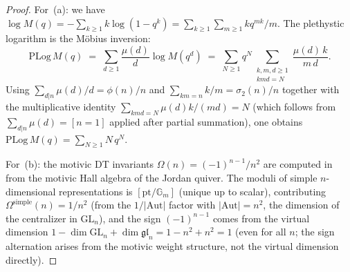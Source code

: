 \begin{proof}
For~(a): we have
$\log M(q) = -\sum_{k \ge 1} k \log(1 - q^k) = \sum_{k \ge 1}
\sum_{m \ge 1} k q^{mk}/m$.
The plethystic logarithm is the M\"{o}bius inversion:
\[
 \mathrm{PLog}\, M(q)
 \;=\;
 \sum_{d \ge 1} \frac{\mu(d)}{d} \log M(q^d)
 \;=\;
 \sum_{N \ge 1} q^N
 \sum_{\substack{k, m, d \ge 1 \\ kmd = N}}
 \frac{\mu(d)\, k}{m\, d}.
\]
Using $\sum_{d|n}\mu(d)/d = \phi(n)/n$ and
$\sum_{km = n} k/m = \sigma_2(n)/n$ together with the multiplicative
identity
$\sum_{kmd = N} \mu(d) k / (md) = N$
(which follows from
$\sum_{d | n} \mu(d) = [n = 1]$ applied after partial summation),
one obtains $\mathrm{PLog}\, M(q) = \sum_{N \ge 1} N\, q^N$.

For~(b): the motivic DT invariants $\Omega(n) = (-1)^{n-1}/n^2$
are computed in~\cite{kontsevich-soibelman} from the motivic Hall
algebra of the Jordan quiver. The moduli of simple $n$-dimensional
representations is $[\mathrm{pt}/\mathbb{G}_m]$ (unique up to scalar),
contributing $\Omega^{\mathrm{simple}}(n) = 1/n^2$ (from the
$1/|\mathrm{Aut}|$ factor with $|\mathrm{Aut}| = n^2$, the
dimension of the centralizer in $\mathrm{GL}_n$), and the sign
$(-1)^{n-1}$ comes from the virtual dimension
$1 - \dim\mathrm{GL}_n + \dim\mathfrak{gl}_n = 1 - n^2 + n^2 = 1$
(even for all $n$; the sign alternation arises from the motivic
weight structure, not the virtual dimension directly).
\end{proof}

